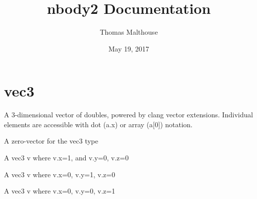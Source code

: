 \documentclass[letterpaper,10pt,english]{sphinxmanual}
\title{nbody2 Documentation}
\date{May 19, 2017}
\author{Thomas Malthouse}
\begin{document}
\maketitle
\sphinxtableofcontents
{}\label{\detokenize{index::doc}}



\chapter{vec3}
\label{\detokenize{vec3:welcome-to-nbody2-s-documentation}}\label{\detokenize{vec3::doc}}\label{\detokenize{vec3:vec3}}

\begin{fulllineitems}
\label{\detokenize{vec3:c.vec3}}
\end{fulllineitems}


A 3-dimensional vector of doubles, powered by clang vector extensions. Individual elements are accessible with dot (a.x) or array (a{[}0{]}) notation.

\begin{fulllineitems}
\label{\detokenize{vec3:c.vec3_0}}
\end{fulllineitems}


A zero-vector for the vec3 type

\begin{fulllineitems}
\label{\detokenize{vec3:c.vec3_I}}
\end{fulllineitems}


A vec3 v where v.x=1, and v.y=0, v.z=0

\begin{fulllineitems}
\label{\detokenize{vec3:c.vec3_J}}
\end{fulllineitems}


A vec3 v where v.x=0, v.y=1, v.z=0

\begin{fulllineitems}
\label{\detokenize{vec3:c.vec3_K}}
\end{fulllineitems}


A vec3 v where v.x=0, v.y=0, v.z=1

\begin{fulllineitems}
\label{\detokenize{vec3:c.vabs}}
\end{fulllineitems}
\end{document}
